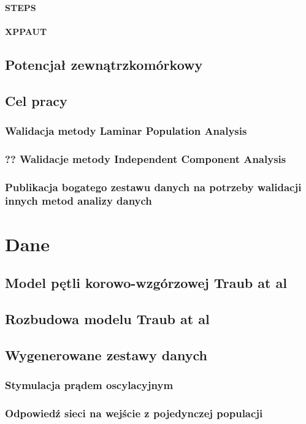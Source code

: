 \documentclass[a4paper,12pt,polish]{book}
\begin{document}
\subsubsection{STEPS}
\subsubsection{XPPAUT}
\section{Potencjał zewnątrzkomórkowy}


\section{Cel pracy}
\subsection{Walidacja metody Laminar Population Analysis}
\subsection{??  Walidacje metody Independent Component Analysis}
\subsection{Publikacja bogatego zestawu danych na potrzeby walidacji innych metod analizy danych}


\chapter{Dane}
\section{Model pętli korowo-wzgórzowej Traub at al}
\section{Rozbudowa modelu Traub at al}
\section{Wygenerowane zestawy danych}
\subsection{Stymulacja prądem oscylacyjnym}
\subsection{Odpowiedź sieci na wejście z pojedynczej populacji}
\end{document}
